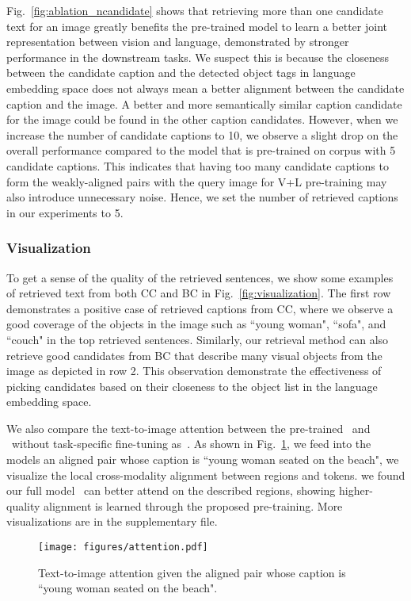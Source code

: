 Fig.~\ref{fig:ablation_ncandidate} shows that retrieving more than one candidate text for an image greatly benefits the pre-trained model to learn a better joint representation between vision and language, demonstrated by stronger performance in the downstream tasks. 
We suspect this is because the closeness between the candidate caption and the detected object tags in language embedding space does not always mean a better alignment between the candidate caption and the image. A better and more semantically similar caption candidate for the image could be found in the other caption candidates. However, when we increase the number of candidate captions to 10, we observe a slight drop on the overall performance compared to the model that is pre-trained on corpus with 5 candidate captions. This indicates that having too many candidate captions to form the weakly-aligned pairs with the query image for V+L pre-training may also introduce unnecessary noise. Hence, we set the number of retrieved captions in our experiments to 5.
 

\subsubsection{Visualization}
To get a sense of the quality of the retrieved sentences, we show some examples of retrieved text from both CC and BC in Fig.~\ref{fig:visualization}. The first row demonstrates a positive case of retrieved captions from CC, where we observe a good coverage of the objects in the image such as ``young woman", ``sofa", and ``couch" in the top retrieved sentences. Similarly, our retrieval method can also retrieve good candidates from BC that describe many visual objects from the image as depicted in row 2. This observation demonstrate the effectiveness of picking candidates based on their closeness to the object list in the language embedding space. 

We also compare the text-to-image attention between the pre-trained \uvisualbert~and \ModelName~without task-specific fine-tuning as~\cite{chen2020uniter,Zhou_2021_CVPR}.
As shown in Fig.~\ref{fig:attention}, we feed into the models an aligned pair whose caption is ``young woman seated on the beach", we visualize the local cross-modality alignment between regions and tokens.
we found our full model \ModelName~can better attend on the described regions, showing higher-quality alignment is learned through the proposed pre-training.
More visualizations are in the supplementary file.



\begin{figure}[h!]
\centering
\texttt{[image: figures/attention.pdf]}
\vspace{-0.5cm}
\caption{Text-to-image attention given the aligned pair whose caption is ``young woman seated on the beach".}
\label{fig:attention}
\end{figure}


